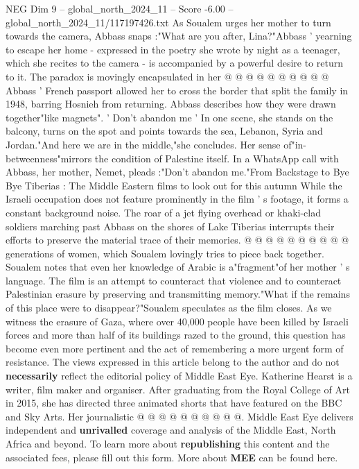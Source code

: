 \begin{textsample}{NEG Dim 9 – global\_north\_2024\_11 – Score -6.00 – global\_north\_2024\_11/117197426.txt}
As Soualem urges her mother to turn towards the camera, Abbass snaps :"What are you after, Lina?"Abbass ' yearning to escape her home - expressed in the poetry she wrote by night as a teenager, which she recites to the camera - is accompanied by a powerful desire to return to it.
The paradox is movingly encapsulated in her @ @ @ @ @ @ @ @ @ @ Abbass ' French passport allowed her to cross the border that split the family in 1948, barring Hosnieh from returning.
Abbass describes how they were drawn together"like magnets". ' Don't abandon me ' In one scene, she stands on the balcony, turns on the spot and points towards the sea, Lebanon, Syria and Jordan."And here we are in the middle,"she concludes.
Her sense of"in-betweenness"mirrors the condition of Palestine itself.
In a WhatsApp call with Abbass, her mother, Nemet, pleads :"Don't abandon me."From Backstage to Bye Bye Tiberias : The Middle Eastern films to look out for this autumn While the Israeli occupation does not feature prominently in the film ' s footage, it forms a constant background noise.
The roar of a jet flying overhead or khaki-clad soldiers marching past Abbass on the shores of Lake Tiberias interrupts their efforts to preserve the material trace of their memories. @ @ @ @ @ @ @ @ @ @ generations of women, which Soualem lovingly tries to piece back together.
Soualem notes that even her knowledge of Arabic is a"fragment"of her mother ' s language.
The film is an attempt to counteract that violence and to counteract Palestinian erasure by preserving and transmitting memory."What if the remains of this place were to disappear?"Soualem speculates as the film closes.
As we witness the erasure of Gaza, where over 40,000 people have been killed by Israeli forces and more than half of its buildings razed to the ground, this question has become even more pertinent and the act of remembering a more urgent form of resistance.
The views expressed in this article belong to the author and do not \textbf{necessarily} reflect the editorial policy of Middle East Eye.
Katherine Hearst is a writer, film maker and organiser.
After graduating from the Royal College of Art in 2015, she has directed three animated shorts that have featured on the BBC and Sky Arts.
Her journalistic @ @ @ @ @ @ @ @ @ @.
Middle East Eye delivers independent and \textbf{unrivalled} coverage and analysis of the Middle East, North Africa and beyond.
To learn more about \textbf{republishing} this content and the associated fees, please fill out this form.
More about \textbf{MEE} can be found here.

\end{textsample}
